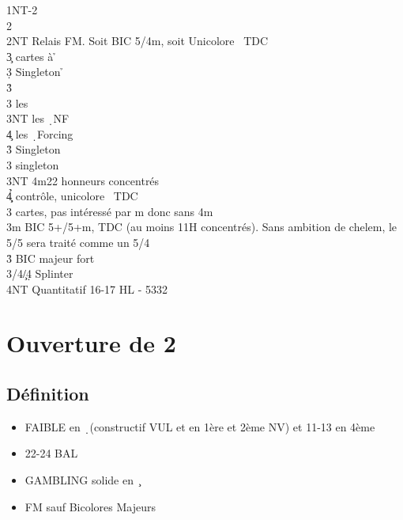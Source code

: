 \documentclass[a4paper]{article}
\begin{document}
\begin{bidtable}
1NT-2\h\\
2\s\+\\
2NT \> Relais FM. Soit BIC 5\s /4m, soit Unicolore \s\ TDC\+\\
3\c {} cartes à \h \+\\
3\d \> Singleton \h \+\\
3\h\+\\
3\s \> les \c \\
3NT \> les \d\ NF\\
4\c \> les \d\ Forcing\-\-\\
3\h \> Singleton \c \\
3\s \> singleton \d \\
3NT \s 4m22 honneurs concentrés\\
4\c\d\h \> contrôle, unicolore \s\ TDC\-\\
3\s {} cartes, pas intéressé par m donc sans 4m\-\\
3m \> BIC 5+\s /5+m, TDC (au moins 11H concentrés). Sans ambition de chelem, le 5/5 sera traité comme un 5/4\\
3\h \> BIC majeur fort\\
3\s/4\c/4\d \> Splinter\\
4NT \> Quantitatif 16-17 HL - 5332\-
\end{bidtable}

\section{Ouverture de 2\pdfc}

\subsection{Définition}

\begin{itemize}
\item FAIBLE en \d\ (constructif VUL et en 1ère et 2ème NV) et 11-13 en 4ème

\item 22-24 BAL

\item GAMBLING solide en \c\ 

\item FM sauf Bicolores Majeurs

\end{itemize}
\end{document}
